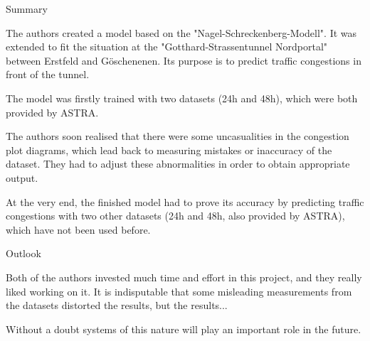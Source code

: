 Summary

The authors created a model based on the "Nagel-Schreckenberg-Modell". It was extended to fit the situation at the
"Gotthard-Strassentunnel Nordportal" between Erstfeld and Göschenenen. Its purpose is to predict traffic congestions in
front of the tunnel.

The model was firstly trained with two datasets (24h and 48h), which were both provided by ASTRA.

The authors soon realised that there were some uncasualities in the congestion plot diagrams, which lead back to
measuring mistakes or inaccuracy of the dataset. They had to adjust these abnormalities in order to obtain appropriate output.

At the very end, the finished model had to prove its accuracy by predicting traffic congestions with two other datasets
(24h and 48h, also provided by ASTRA), which have not been used before.


Outlook

Both of the authors invested much time and effort in this project, and they really liked working on it. It is indisputable
that some misleading measurements from the datasets distorted the results, but the results...

Without a doubt systems of this nature will play an important role in the future.
